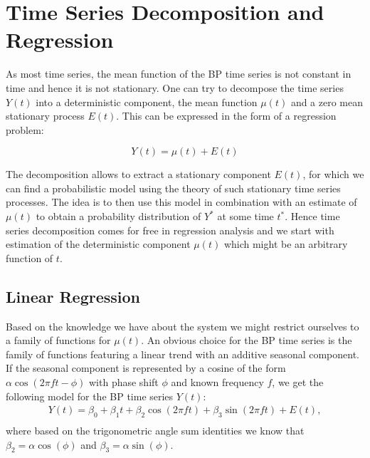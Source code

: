 

\chapter{Time Series Decomposition and Regression}\label{ch:time-series-decomposition-and-regression}



As most time series, the mean function of the BP time series is not constant in time and hence it is not stationary.
One can try to decompose the time series $Y(t)$ into a deterministic component, the mean function $\mu(t)$
and a zero mean stationary process $E(t)$. This can be expressed in the form of a regression problem:

\[ Y(t)= \mu(t) + E(t) \]

The decomposition allows to extract a stationary component $E(t)$, for which we can find a probabilistic model
using the theory of such stationary time series processes. The idea is to then use this model in combination
with an estimate of $\mu(t)$ to obtain a probability distribution of $Y^{\ast}$ at some time $t^{\ast}$.
Hence time series decomposition comes for free in regression analysis and we start with estimation of
the deterministic component $\mu(t)$ which might be an arbitrary function of $t$.

\section{Linear Regression}\label{sec:linear-regression}
Based on the knowledge we have about the system we might restrict ourselves to a family of functions for $\mu(t)$.
An obvious choice for the BP time series is the family of functions featuring a linear trend
with an additive seasonal component.
If the seasonal component is represented by a cosine of the form $\alpha \cos(2 \pi f t - \phi)$ with phase shift $\phi$
and known frequency $f$, we get the following model for the BP time series $Y(t)$:
\begin{gather*}
Y(t) = \beta_0 + \beta_1 t + \beta_2 \cos(2 \pi f t) + \beta_3 \sin(2 \pi f t) + E(t), \\
\end{gather*}
where based on the trigonometric angle sum identities we know that $\beta_2 = \alpha \cos(\phi)$ and $\beta_3 = \alpha \sin(\phi)$.

